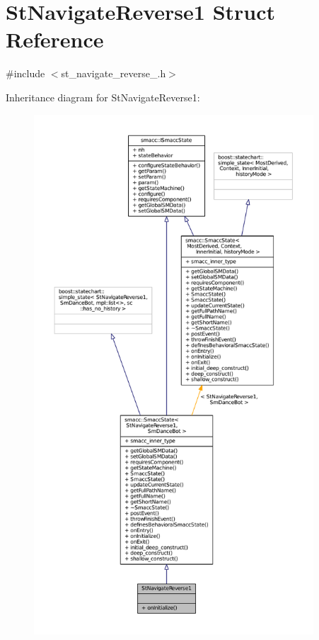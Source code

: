 \hypertarget{structStNavigateReverse1}{}\section{St\+Navigate\+Reverse1 Struct Reference}
\label{structStNavigateReverse1}


{\ttfamily \#include $<$st\+\_\+navigate\+\_\+reverse\+\_.\+h$>$}



Inheritance diagram for St\+Navigate\+Reverse1\+:
\nopagebreak
\begin{figure}[H]
\begin{center}
\leavevmode
\includegraphics[height=550pt]{structStNavigateReverse1__inherit__graph}
\end{center}
\end{figure}


